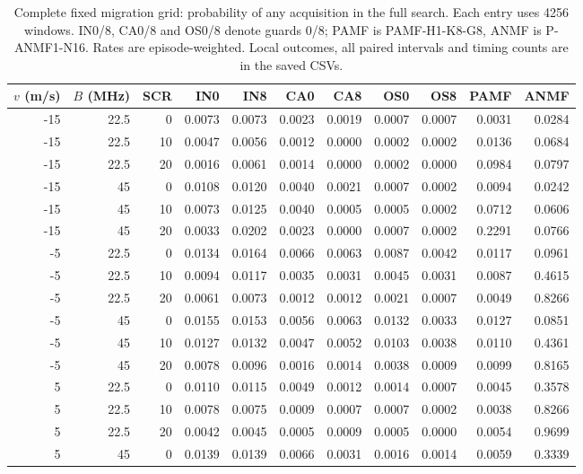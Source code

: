 \documentclass[10pt]{article}
\begin{document}
\begin{table}[htbp]\centering\small\setlength{\tabcolsep}{3pt}
\caption{Complete fixed migration grid: probability of any acquisition in the full search. Each entry uses 4256 windows. IN0/8, CA0/8 and OS0/8 denote guards 0/8; PAMF is PAMF-H1-K8-G8, ANMF is P-ANMF1-N16. Rates are episode-weighted. Local outcomes, all paired intervals and timing counts are in the saved CSVs.}\label{tab:migration_targets}
\begin{tabular}{rrr*{8}{r}}\toprule
$v$ (m/s) & $B$ (MHz) & SCR & IN0 & IN8 & CA0 & CA8 & OS0 & OS8 & PAMF & ANMF\\\midrule
-15 & 22.5 & 0 & 0.0073 & 0.0073 & 0.0023 & 0.0019 & 0.0007 & 0.0007 & 0.0031 & 0.0284\\
-15 & 22.5 & 10 & 0.0047 & 0.0056 & 0.0012 & 0.0000 & 0.0002 & 0.0002 & 0.0136 & 0.0684\\
-15 & 22.5 & 20 & 0.0016 & 0.0061 & 0.0014 & 0.0000 & 0.0002 & 0.0000 & 0.0984 & 0.0797\\
-15 & 45 & 0 & 0.0108 & 0.0120 & 0.0040 & 0.0021 & 0.0007 & 0.0002 & 0.0094 & 0.0242\\
-15 & 45 & 10 & 0.0073 & 0.0125 & 0.0040 & 0.0005 & 0.0005 & 0.0002 & 0.0712 & 0.0606\\
-15 & 45 & 20 & 0.0033 & 0.0202 & 0.0023 & 0.0000 & 0.0007 & 0.0002 & 0.2291 & 0.0766\\
-5 & 22.5 & 0 & 0.0134 & 0.0164 & 0.0066 & 0.0063 & 0.0087 & 0.0042 & 0.0117 & 0.0961\\
-5 & 22.5 & 10 & 0.0094 & 0.0117 & 0.0035 & 0.0031 & 0.0045 & 0.0031 & 0.0087 & 0.4615\\
-5 & 22.5 & 20 & 0.0061 & 0.0073 & 0.0012 & 0.0012 & 0.0021 & 0.0007 & 0.0049 & 0.8266\\
-5 & 45 & 0 & 0.0155 & 0.0153 & 0.0056 & 0.0063 & 0.0132 & 0.0033 & 0.0127 & 0.0851\\
-5 & 45 & 10 & 0.0127 & 0.0132 & 0.0047 & 0.0052 & 0.0103 & 0.0038 & 0.0110 & 0.4361\\
-5 & 45 & 20 & 0.0078 & 0.0096 & 0.0016 & 0.0014 & 0.0038 & 0.0009 & 0.0099 & 0.8165\\
5 & 22.5 & 0 & 0.0110 & 0.0115 & 0.0049 & 0.0012 & 0.0014 & 0.0007 & 0.0045 & 0.3578\\
5 & 22.5 & 10 & 0.0078 & 0.0075 & 0.0009 & 0.0007 & 0.0007 & 0.0002 & 0.0038 & 0.8266\\
5 & 22.5 & 20 & 0.0042 & 0.0045 & 0.0005 & 0.0009 & 0.0005 & 0.0000 & 0.0054 & 0.9699\\
5 & 45 & 0 & 0.0139 & 0.0139 & 0.0066 & 0.0031 & 0.0016 & 0.0014 & 0.0059 & 0.3339\\

\end{tabular}
\end{table}
\end{document}
